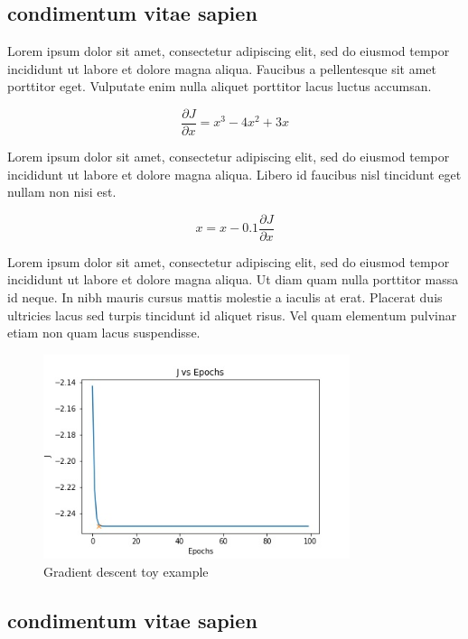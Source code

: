 \documentclass{cup-ino}
\begin{document}
\subsection{condimentum vitae sapien}
Lorem ipsum dolor sit amet, consectetur adipiscing elit, sed do eiusmod tempor incididunt ut labore et dolore magna aliqua. Faucibus a pellentesque sit amet porttitor eget. Vulputate enim nulla aliquet porttitor lacus luctus accumsan.

\begin{equation} 
\label{toy_grad_eqn}
\frac{\partial J}{\partial x} = x^3-4x^2+3x
\end{equation}

\noindent Lorem ipsum dolor sit amet, consectetur adipiscing elit, sed do eiusmod tempor incididunt ut labore et dolore magna aliqua. Libero id faucibus nisl tincidunt eget nullam non nisi est.

\begin{equation} 
\label{toy_update_eqn}
x = x - 0.1\frac{\partial J}{\partial x}
\end{equation}

Lorem ipsum dolor sit amet, consectetur adipiscing elit, sed do eiusmod tempor incididunt ut labore et dolore magna aliqua. Ut diam quam nulla porttitor massa id neque. In nibh mauris cursus mattis molestie a iaculis at erat. Placerat duis ultricies lacus sed turpis tincidunt id aliquet risus. Vel quam elementum pulvinar etiam non quam lacus suspendisse.

\begin{figure}[h!]
\centering
\includegraphics[width=0.8\textwidth]{images/grad_toy_ex.jpeg}
\caption{Gradient descent toy example}
\label{fig:grad_toy_ex}
\end{figure}

\subsection{condimentum vitae sapien}
\end{document}
